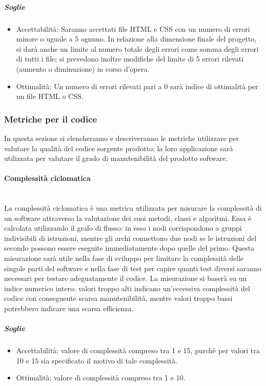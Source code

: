 \subparagraph{Soglie}
	\begin{itemize}
	\item Accettabilità: Saranno accettati file HTML e CSS con un numero di errori minore o uguale a 5 ognuno. In relazione alla dimensione finale del progetto, si darà anche un limite al numero totale degli errori come somma degli errori di tutti i file; si prevedono inoltre modifiche del limite di 5 errori rilevati (aumento o diminuzione) in corso d'opera.
	\item Ottimalità: Un numero di errori rilevati pari a 0 sarà indice di ottimalità per un file HTML o CSS.
	\end{itemize}
	
\pagebreak
\subsubsection{Metriche per il codice}
\label{AppB:metricheCod}
In questa sezione si elencheranno e descriveranno le metriche utilizzare per valutare la qualità del codice sorgente prodotto; la loro applicazione sarà utilizzata per valutare il grado di manutenibilità del prodotto software.

\paragraph{Complessità ciclomatica}
	~\\La complessità ciclomatica è una metrica utilizzata per misurare la complessità di un software attraverso la valutazione dei suoi metodi, classi e algoritmi. Essa è calcolata utilizzando il grafo di flusso: in esso i nodi corrispondono a gruppi indivisibili di istruzioni, mentre gli archi connettono due nodi se le istruzioni del secondo possono essere eseguite immediatamente dopo quelle del primo.
Questa misurazione sarà utile nella fase di sviluppo per limitare la complessità delle singole parti del software e nella fase di test per capire quanti test diversi saranno necessari per testare adeguatamente il codice.
La misurazione si baserà su un indice numerico intero: valori troppo alti indicano un'eccessiva complessità del codice con conseguente scarsa manutenibilità, mentre valori troppo bassi potrebbero indicare una scarsa efficienza.

\subparagraph{Soglie}
	\begin{itemize}
	\item Accettabilità: valore di complessità compreso tra 1 e 15, purchè per valori tra 10 e 15 sia specificato il motivo di tale complessità.
 	\item Ottimalità: valore di complessità compreso tra 1 e 10.
	\end{itemize}

